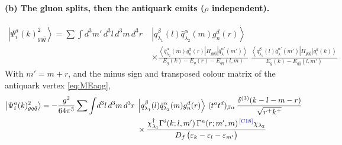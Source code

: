 \documentclass[11pt]{article}
\newcommand{\eps}{\varepsilon}
\newcommand{\dg}{\dagger}
\newcommand{\dthree}{\delta^{(3)}}
\newcommand{\ket}[1]{\left|#1\right\rangle}
\newcommand{\bra}[1]{\left\langle#1\right|}
\newcommand{\Gam}{\Gamma}
\newcommand{\qk}[3]{q^{#1}_{#2}(#3)}
\newcommand{\aqk}[3]{\bar q^{#1}_{#2}(#3)}
\newcommand{\gl}[3]{g^{#1}_{#2}(#3)}
\newcommand{\chg}[1]{{\color{blue!70!black}\textsuperscript{\,[C#1]}}}
\begin{document}
\paragraph{(b) The gluon splits, then the antiquark emits ($\rho$ independent).}
\begin{center}
\end{center}
\begin{align}
\ket{\Psi^{a}_{i}(k)^{2}_{gq\bar q}}=\sum\int\! d^{3}m'\,d^{3}l\,d^{3}m\,d^{3}r\;
&\ket{\qk{\beta}{\lambda_{1}}{l}\aqk{\alpha}{\lambda_{2}}{m}\gl{d}{n}{r}}
\nonumber\\&\times
\frac{\bra{\aqk{\alpha}{\lambda_{2}}{m}\gl{d}{n}{r}}H_{gq\bar q}\ket{\aqk{\alpha'}{\lambda}{m'}}}
{E_{g}(k)-E_{g}(r)-E_{q\bar q}(l,m)}\;
\frac{\bra{\qk{\beta}{\lambda_{1}}{l}\aqk{\alpha'}{\lambda}{m'}}H_{gq\bar q}\ket{\gl{a}{i}{k}}}
{E_{g}(k)-E_{q\bar q}(l,m')}
\end{align}
With $m'=m+r$, and the minus sign and transposed colour matrix of the antiquark vertex
\eqref{eq:MEaqg},
\begin{align}
\ket{\Psi^{a}_{i}(k)^{2}_{gq\bar q}}=-\frac{g^{2}}{64\pi^{3}}\sum\int\! d^{3}l\,d^{3}m\,d^{3}r\;
&\ket{\qk{\beta}{\lambda_{1}}{l}\aqk{\alpha}{\lambda_{2}}{m}\gl{d}{n}{r}}\,
(t^{a}t^{d})_{\beta\alpha}\,\frac{\dthree(k-l-m-r)}{\sqrt{r^{+}k^{+}}}
\nonumber\\&\times
\frac{\chi^{\dg}_{\lambda_{1}}\Gam^{i}(k;l,m')\,\Gam^{n}(r;m',m)\chg{18}\chi_{\lambda_{2}}}
{D_{f}\,\big(\eps_{k}-\eps_{l}-\eps_{m'}\big)}
\label{eq:B2b}
\end{align}
\end{document}
